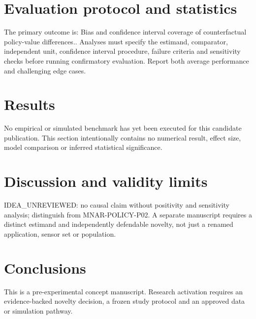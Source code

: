 \documentclass[11pt,a4paper]{article}
\begin{document}
\section{Evaluation protocol and statistics}
The primary outcome is: Bias and confidence interval coverage of counterfactual policy-value differences.. Analyses must specify the estimand, comparator, independent unit, confidence interval procedure, failure criteria and sensitivity checks before running confirmatory evaluation. Report both average performance and challenging edge cases.
\section{Results}
No empirical or simulated benchmark has yet been executed for this candidate publication. This section intentionally contains no numerical result, effect size, model comparison or inferred statistical significance.
\section{Discussion and validity limits}
IDEA\_UNREVIEWED: no causal claim without positivity and sensitivity analysis; distinguish from MNAR-POLICY-P02. A separate manuscript requires a distinct estimand and independently defendable novelty, not just a renamed application, sensor set or population.
\section{Conclusions}
This is a pre-experimental concept manuscript. Research activation requires an evidence-backed novelty decision, a frozen study protocol and an approved data or simulation pathway.
\end{document}
